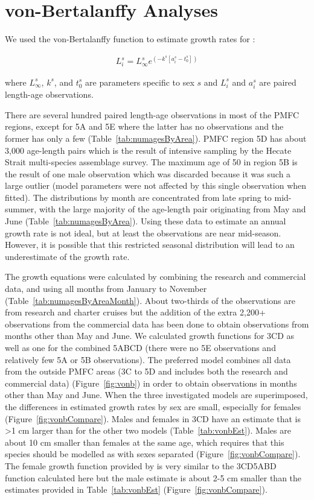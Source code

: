 \section{von-Bertalanffy Analyses}

We used the von-Bertalanffy function to estimate growth rates for \fishname:

\begin{align} \label{eq:vonb}
L_i^s = L_\infty^se^{(-k^s[a_i^s-t_0^s])}
\end{align}
\begin{addmargin}[3em]{1em}
where $L_\infty^s$, $k^s$, and $t_0^s$ are parameters specific to sex $s$ and $L_i^s$ and $a_i^s$ are paired length-age observations.
\end{addmargin}

There are several hundred paired length-age observations in most of the PMFC regions, except for 5A and 5E where the latter has no observations and the former has only a few (Table~\ref{tab:numagesByArea}). PMFC region 5D has about 3,000 age-length pairs which is the result of intensive sampling by the Hecate Strait multi-species assemblage survey. The maximum age of 50 in region 5B is the result of one male observation which was discarded because it was such a large outlier (model parameters were not affected by this single observation when fitted). The distributions by month are concentrated from late spring to mid-summer, with the large majority of the age-length pair originating from May and June (Table~\ref{tab:numagesByArea}). Using these data to estimate an annual growth rate is not ideal, but at least the observations are near mid-season. However, it is possible that this restricted seasonal distribution will lead to an underestimate of the growth rate.

The growth equations were calculated by combining the research and commercial data, and using all months from January to November (Table~\ref{tab:numagesByAreaMonth}). About two-thirds of the observations are from research and charter cruises but the addition of the extra 2,200+ observations from the commercial data has been done to obtain observations from months other than May and June. We calculated growth functions for 3CD as well as one for the combined 5ABCD (there were no 5E observations and relatively few 5A or 5B observations). The preferred model combines all data from the outside PMFC areas (3C to 5D and includes both the research and commercial data) (Figure~\ref{fig:vonb}) in order to obtain observations in months other than May and June. When the three investigated models are superimposed, the differences in estimated growth rates by sex are small, especially for females (Figure~\ref{fig:vonbCompare}). Males and females in 3CD have an  estimate that is \textgreater1 cm larger than for the other two models (Table~\ref{tab:vonbEst}). Males are about 10 cm smaller than females at the same age, which requires that this species should be modelled as with sexes separated (Figure~\ref{fig:vonbCompare}). The female growth function provided by \citet{arf2001} is very similar to the 3CD5ABD function calculated here but the male estimate is about 2-5 cm smaller than the estimates provided in Table~\ref{tab:vonbEst} (Figure~\ref{fig:vonbCompare}).

